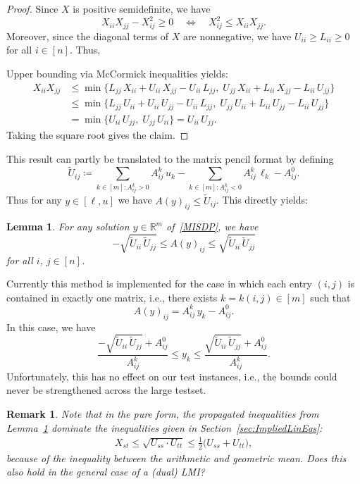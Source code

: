 \documentclass[10pt, a4paper]{article}
\newcommand{\define}{\coloneqq}
\newcommand{\R}{\mathds{R}}
\newtheorem{lemma}[theorem]{Lemma}
\newtheorem{remark}[theorem]{Remark}
\begin{document}
\begin{proof}
  Since $X$ is positive semidefinite, we have
  \[
    X_{ii} X_{jj} - X_{ij}^2 \geq 0
    \quad\Leftrightarrow\quad
    X_{ij}^2 \leq X_{ii} X_{jj}.
  \]
  Moreover, since the diagonal terms of $X$ are nonnegative, we have
  $U_{ii} \geq L_{ii} \geq 0$ for all $i \in [n]$. Thus,

  Upper bounding via
  McCormick inequalities yields:
  \begin{align*}
    X_{ii} X_{jj} & \leq \min \{L_{jj}\, X_{ii} + U_{ii}\, X_{jj} - U_{ii}\, L_{jj},\;
                    U_{jj}\, X_{ii} + L_{ii}\, X_{jj} - L_{ii}\, U_{jj}\}  \\
    & \leq \min \{L_{jj}\, U_{ii} + U_{ii}\, U_{jj} - U_{ii}\, L_{jj},\;
                    U_{jj}\, U_{ii} + L_{ii}\, U_{jj} - L_{ii}\, U_{jj}\}  \\
    & = \min \{U_{ii}\, U_{jj},\;  U_{jj}\, U_{ii}\} = U_{ii}\, U_{jj}.
  \end{align*}
  Taking the square root gives the claim.
\end{proof}

This result can partly be translated to the matrix pencil format by defining
\[
  \tilde{U}_{ij} \define \sum_{k \in [m]: A^k_{ij} > 0} A^k_{ij}\, u_k -
  \sum_{k \in [m]: A^k_{ij} < 0} A^k_{ij}\, \ell_k - A^0_{ij}.
\]
Thus for any $y \in [\ell,u]$ we have $A(y)_{ij} \leq \tilde{U}_{ij}$. This
directly yields:

\begin{lemma}\label{lem:Propagation}
  For any solution $y \in \R^m$ of~\eqref{MISDP}, we have
  \[
    -\sqrt{\tilde{U}_{ii}\,\tilde{U}_{jj}} \leq A(y)_{ij} \leq \sqrt{\tilde{U}_{ii}\,\tilde{U}_{jj}}
  \]
  for all $i$, $j \in [n]$.
\end{lemma}

Currently this method is implemented for the case in which each entry
$(i,j)$ is contained in exactly one matrix, i.e., there exists
$k = k(i,j) \in [m]$ such that
\[
  A(y)_{ij} = A^k_{ij}\, y_k - A^0_{ij}.
\]
In this case, we have
\[
  \frac{-\sqrt{\tilde{U}_{ii}\,\tilde{U}_{jj}} + A^0_{ij}}{A^k_{ij}} \leq y_k \leq
  \frac{\sqrt{\tilde{U}_{ii}\,\tilde{U}_{jj}} + A^0_{ij}}{A^k_{ij}}.
\]
Unfortunately, this has no effect on our test instances, i.e., the bounds
could never be strengthened across the large testset.

\begin{remark}
  Note that in the pure form, the propagated inequalities from
  Lemma~\ref{lem:Propagation} dominate the inequalities given in
  Section~\ref{sec:ImpliedLinEqs}:
  \begin{align*}
    X_{st} \leq \sqrt{U_{ss} \cdot U_{tt}} \leq \frac{1}{2}\big( U_{ss} + U_{tt}\big),
  \end{align*}
  because of the inequality between the arithmetic and geometric mean. Does
  this also hold in the general case of a (dual) LMI?
\end{remark}
\end{document}
